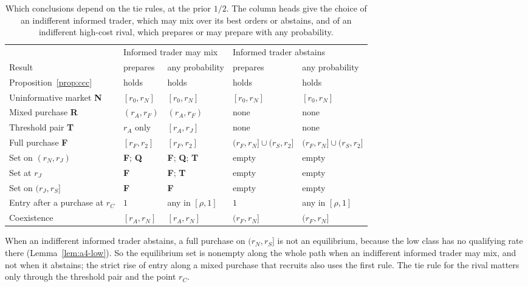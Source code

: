\begin{table}[ht]
\centering
\caption{Which conclusions depend on the tie rules, at the prior \(1/2\). The column heads give the choice of an
indifferent informed trader, which may mix over its best orders or abstains, and of an indifferent high-cost rival,
which prepares or may prepare with any probability.}\label{tab:a4-ties}
\small
\begin{tabular}{@{}lllll@{}}
\toprule
 & \multicolumn{2}{l}{Informed trader may mix} & \multicolumn{2}{l}{Informed trader abstains}\\
\cmidrule(lr){2-3}\cmidrule(lr){4-5}
Result & prepares & any probability & prepares & any probability\\
\midrule
Proposition~\ref{prop:ccc} & holds & holds & holds & holds\\
Uninformative market \textbf{N} & \([r_0,r_N]\) & \([r_0,r_N]\) & \([r_0,r_N]\) & \([r_0,r_N]\)\\
Mixed purchase \textbf{R} & \((r_A,r_F)\) & \((r_A,r_F)\) & none & none\\
Threshold pair \textbf{T} & \(r_A\) only & \([r_A,r_J]\) & none & none\\
Full purchase \textbf{F} & \([r_F,r_2]\) & \([r_F,r_2]\) & \((r_F,r_N]\cup(r_S,r_2]\) & \((r_F,r_N]\cup(r_S,r_2]\)\\
Set on \((r_N,r_J)\) & \textbf{F}; \textbf{Q} & \textbf{F}; \textbf{Q}; \textbf{T} & empty & empty\\
Set at \(r_J\) & \textbf{F} & \textbf{F}; \textbf{T} & empty & empty\\
Set on \((r_J,r_S]\) & \textbf{F} & \textbf{F} & empty & empty\\
Entry after a purchase at \(r_C\) & \(1\) & any in \([\rho,1]\) & \(1\) & any in \([\rho,1]\)\\
Coexistence & \([r_A,r_N]\) & \([r_A,r_N]\) & \((r_F,r_N]\) & \((r_F,r_N]\)\\
\bottomrule
\end{tabular}
\end{table}

When an indifferent informed trader abstains, a full purchase on \((r_N,r_S]\) is not an equilibrium, because the low class
has no qualifying rate there (Lemma~\ref{lem:a4-low}). So the equilibrium set is nonempty along the whole path when an
indifferent informed trader may mix, and not when it abstains; the strict rise of entry along a mixed purchase that recruits
also uses the first rule. The tie rule for the rival matters only through the threshold pair and the point \(r_C\).
